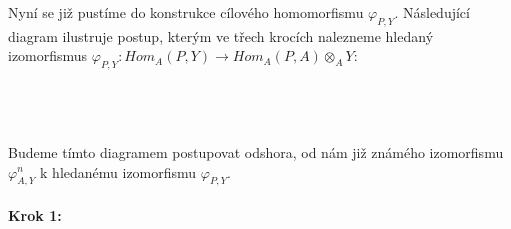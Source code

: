         Nyní se již pustíme do konstrukce cílového homomorfismu $\varphi_{P,Y}$.
        Následující diagram ilustruje postup, kterým ve třech krocích nalezneme hledaný izomorfismus 
        $\varphi_{P,Y}:Hom_A(P,Y)\rightarrow Hom_A(P,A)\otimes_A Y$: \\\\      
         \centerline{}\\\\
        Budeme tímto diagramem postupovat odshora, od nám již známého 
        izomorfismu $\varphi^n_{A,Y}$ k hledanému izomorfismu 
        $\varphi_{P,Y}$.
        
       \paragraph{Krok 1:} 
       
